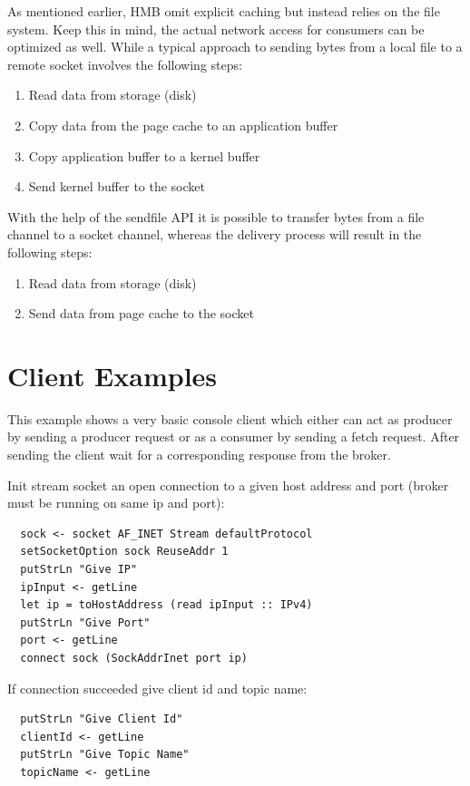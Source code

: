 As mentioned earlier, HMB omit explicit caching but instead relies on the file system.
Keep this in mind, the actual network access for consumers can be optimized as well.
While a typical approach to sending bytes from a local file to a remote
socket involves the following steps: 
\begin{enumerate}
  \item Read data from storage (disk)
  \item Copy data from the page cache to an application buffer
  \item Copy application buffer to a kernel buffer
  \item Send kernel buffer to the socket
\end{enumerate}

With the help of the sendfile API  it is possible to transfer bytes
from a file channel to a socket channel, whereas the delivery process will
result in the following steps:

\begin{enumerate}
  \item Read data from storage (disk)
  \item Send data from page cache to the socket
\end{enumerate}

\section{Client Examples}
This example shows a very basic console client which either can act as producer
by sending a producer request or as a consumer by sending a fetch request. After
sending the client wait for a corresponding response from the broker.

Init stream socket an open connection to a given host address and port (broker must be running on same ip and port): 
\begin{lstlisting}
  sock <- socket AF_INET Stream defaultProtocol 
  setSocketOption sock ReuseAddr 1
  putStrLn "Give IP"
  ipInput <- getLine
  let ip = toHostAddress (read ipInput :: IPv4)
  putStrLn "Give Port"
  port <- getLine
  connect sock (SockAddrInet port ip)
\end{lstlisting}

If connection succeeded give client id and topic name: 
\begin{lstlisting}
  putStrLn "Give Client Id"
  clientId <- getLine
  putStrLn "Give Topic Name"
  topicName <- getLine
\end{lstlisting}

